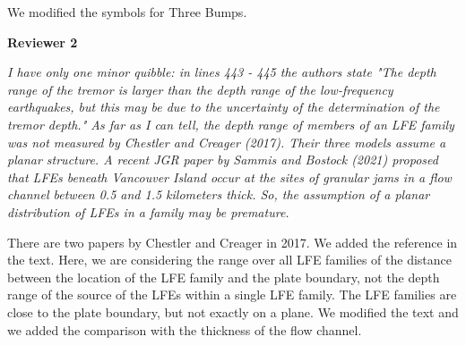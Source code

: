 \documentclass[letterpaper, 12pt]{article}
\begin{document}
\bigskip

We modified the symbols for Three Bumps.

\bigskip

\textbf{Reviewer 2}

\bigskip

\textit{I have only one minor quibble: in lines 443 - 445 the authors state "The depth range of the tremor is larger than the depth range of the low-frequency earthquakes, but this may be due to the uncertainty of the determination of the tremor depth." As far as I can tell, the depth range of members of an LFE family was not measured by Chestler and Creager (2017). Their three models assume a planar structure. A recent JGR paper by Sammis and Bostock (2021) proposed that LFEs beneath Vancouver Island occur at the sites of granular jams in a flow channel between 0.5 and 1.5 kilometers thick. So, the assumption of a planar distribution of LFEs in a family may be premature.}

\bigskip

There are two papers by Chestler and Creager in 2017. We added the reference in the text. Here, we are considering the range over all LFE families of the distance between the location of the LFE family and the plate boundary, not the depth range of the source of the LFEs within a single LFE family. The LFE families are close to the plate boundary, but not exactly on a plane. We modified the text and we added the comparison with the thickness of the flow channel.
\end{document}
